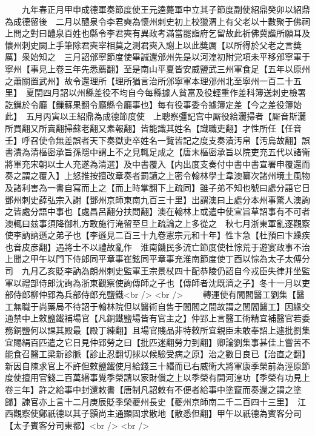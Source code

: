 　　九年春正月甲申成德軍奏節度使王元逵薨軍中立其子節度副使紹鼎癸卯以紹鼎為成德留後　二月以醴泉令李君奭為懷州刺史初上校獵渭上有父老以十數聚于佛祠上問之對曰醴泉百姓也縣令李君奭有異政考滿當罷詣府乞留故此祈佛冀諧所願耳及懷州刺史闕上手筆除君奭宰相莫之測君奭入謝上以此奬厲【以所得於父老之言奬厲】衆始知之　三月詔邠寧節度使畢諴還邠州先是以河湟初附党項未平移邠寧軍于寧州【事見上卷三年先悉薦翻】至是南山平夏皆安威鹽武三州軍食足【五年以原州之蕭關置武州】故令還理所【理所猶言治所邠寧軍本理邠州北至寧州一百二十五里】　夏閏四月詔以州縣差役不均自今每縣據人貧富及役輕重作差科簿送刺史檢署訖鏁於令廳【鏁蘇果翻令廳縣令廳事也】每有役事委令據簿定差【今之差役簿始此】　五月丙寅以王紹鼎為成德節度使　上聰察彊記宫中厮役給灑掃者【厮音斯灑所買翻又所賣翻掃蘇老翻又素報翻】皆能識其姓名【識職吏翻】才性所任【任音壬】呼召使令無差誤者天下奏獄吏卒姓名一覽皆記之度支奏漬汚帛【汚烏故翻】誤書漬為清樞密承旨孫隱中謂上不之見輒足成之【唐末樞密承旨以院吏充五代以諸衛將軍充宋朝以士人充遂為清選】及中書覆入【内出度支奏付中書中書宣署申覆還而奏之謂之覆入】上怒推按擅改章奏者罰讁之上密令翰林學士韋澳纂次諸州境土風物及諸利害為一書自寫而上之【而上時掌翻下上疏同】雖子弟不知也號曰處分語它日鄧州刺史薛弘宗入謝【鄧州京師東南九百三十里】出謂澳曰上處分本州事驚人澳詢之皆處分語中事也【處昌呂翻分扶問翻】澳在翰林上或遣中使宣旨草詔事有不可者澳輒曰兹事須降御札方敢施行淹留至旦上疏論之上多從之　秋七月浙東軍亂逐觀察使李訥訥遜之弟子也【李遜見二百三十九卷憲宗元和十年】性卞急【杜預曰卞躁疾也音皮彦翻】遇將士不以禮故亂作　淮南饑民多流亡節度使杜悰荒于遊宴政事不治上聞之甲午以門下侍郎同平章事崔鉉同平章事充淮南節度使丁酉以悰為太子太傅分司　九月乙亥貶李訥為朗州刺史監軍王宗景杖四十配恭陵仍詔自今戎臣失律并坐監軍以禮部侍郎沈詢為浙東觀察使詢傳師之子也【傳師者沈既濟之子】冬十一月以吏部侍郎柳仲郢為兵部侍郎充鹽鐵<br />
<br />
　　轉運使有閭閻醫工劉集【醫工無職于尚藥局不待詔于翰林院但以醫術自售于閭閻之間故謂之閭閻醫工】因緣交通禁中上敕鹽鐵補場官【凡銅鐵鹽場皆有官主之】仲郢上言醫工術精宜補醫官若委務銅鹽何以課其殿最【殿丁練翻】且場官賤品非特敕所宜親臣未敢奉詔上遽批劉集宜賜絹百匹遣之它日見仲郢勞之曰【批匹迷翻勞力到翻】卿論劉集事甚佳上嘗苦不能食召醫工梁新診脈【診止忍翻切捄以候驗受病之原】治之數日良已【治直之翻】新因自陳求官上不許但敕鹽鐵使月給錢三十緡而已右威衛大將軍康季榮前為涇原節度使擅用官錢二百萬緡事覺季榮請以家財償之上以季榮有開河湟功【季榮有功見上卷三年】許之給事中封還敕書【唐制凡詔敕有不便者給事中塗竄而奏還之謂之塗歸】諫官亦上言十二月庚辰貶季榮夔州長史【夔州京師南二千二百四十三里】　江西觀察使鄭祇德以其子顥尚主通顯固求散地【散悉但翻】甲午以祇德為賓客分司【太子賓客分司東都】<br />
<br />
